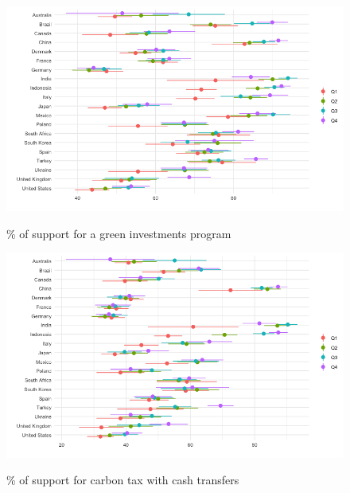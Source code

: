 \begin{frame}{}%
\begin{figure}[h!]
\caption{\% of support for a green investments program} %
\includegraphics[width=.7\paperwidth]{../figures/country_comparison/investments_support_income_each_country.png} \\
\end{figure}
\end{frame}

\begin{frame}{}%
\begin{figure}[h!]
\caption{\% of support for carbon tax with cash transfers} %
\includegraphics[width=.7\paperwidth]{../figures/country_comparison/tax_transfers_support_income_each_country.png} \\
\end{figure}
\end{frame}

